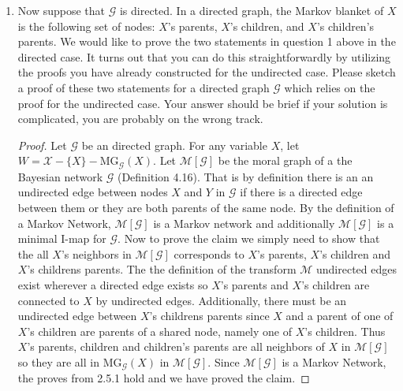 \documentclass[12pt]{article}
\newcommand{\mg} {\text{MG}_{\mathcal{G}}}
\begin{document}
\begin{enumerate}[1.]
	\item 
			Now suppose that $\mathcal{G}$ is directed. In a directed graph, the Markov blanket of $X$ is the following set of nodes: $X$'s parents, $X$'s children, and $X$'s children’s parents. We would like to prove the two statements in question 1 above in the directed case. It turns out that you can do this straightforwardly by utilizing the proofs you have already constructed for the undirected case. Please sketch a proof of these two statements for a directed graph $\mathcal{G}$ which relies on the proof for the undirected case. Your answer should be brief if your solution is complicated, you are probably on the wrong track.
\begin{proof}
Let $\mathcal{G}$ be an directed graph. For any variable $X$, let $W = \mathcal{X} - \{ X\} - \mg(X)$. 
Let $\mathcal{M}[\mathcal{G}]$ be the moral graph of a the Bayesian network $\mathcal{G}$ (Definition 4.16). That is by definition there is an an undirected edge between nodes $X$ and $Y$ in $\mathcal{G}$ if there is a directed edge between them or they are both parents of the same node. By the definition of a Markov Network, $\mathcal{M}[{\mathcal{G}}]$ is a Markov network and additionally $\mathcal{M}[\mathcal{G}]$ is a minimal I-map for $\mathcal{G}$. Now to prove the claim we simply need to show that the  all $X$'s neighbors in $\mathcal{M}[\mathcal{G}]$ corresponds to $X$'s parents, $X$'s children and $X$'s childrens parents. The the definition of the transform $\mathcal{M}$ undirected edges exist wherever a directed edge exists so $X$'s parents and $X$'s children are connected to $X$ by undirected edges. Additionally, there must be an undirected edge between $X$'s childrens parents since $X$ and a parent of one of $X$'s children are parents of a shared node, namely one of $X$'s children. Thus $X$'s parents, children and children's parents are all neighbors of $X$ in $\mathcal{M}[\mathcal{G}]$ so they are all in $\mg(X)$ in $\mathcal{M}[\mathcal{G}]$. Since $\mathcal{M}[\mathcal{G}]$ is a Markov Network, the proves from 2.5.1 hold and we have proved the claim.
\end{proof}

\end{enumerate}
\end{document}
